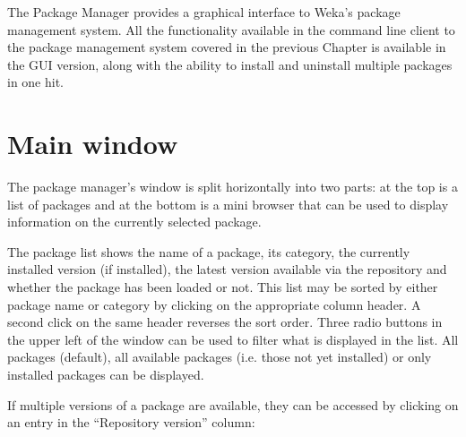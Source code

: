 %
%
%
%



The Package Manager provides a graphical interface to Weka's package
management system. All the functionality available in the command line
client to the package management system covered in the previous
Chapter is available in the GUI version, along with the ability to
install and uninstall multiple packages in one hit.

\section{Main window}

\begin{center}
\end{center}

The package manager's window is split horizontally into two parts: at
the top is a list of packages and at the bottom is a mini browser that
can be used to display information on the currently selected
package. 

The package list shows the name of a package, its category, the
currently installed version (if installed), the latest version
available via the repository and whether the package has been loaded
or not. This list may be sorted by either package name or category by
clicking on the appropriate column header. A second click on the same
header reverses the sort order. Three radio buttons in the upper left
of the window can be used to filter what is displayed in the list. All
packages (default), all available packages (i.e. those not yet
installed) or only installed packages can be displayed.

If multiple versions of a package are available, they can be accessed by
clicking on an entry in the ``Repository version'' column:


